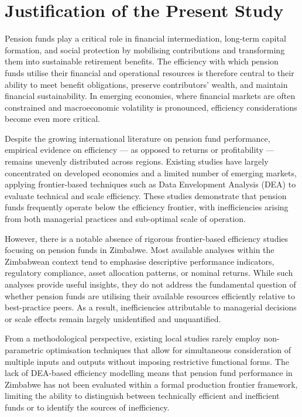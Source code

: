 \documentclass[12pt,a4paper]{article}
\begin{document}
\section{Justification of the Present Study}

Pension funds play a critical role in financial intermediation, long-term capital formation, and social protection by mobilising contributions and transforming them into sustainable retirement benefits. The efficiency with which pension funds utilise their financial and operational resources is therefore central to their ability to meet benefit obligations, preserve contributors' wealth, and maintain financial sustainability. In emerging economies, where financial markets are often constrained and macroeconomic volatility is pronounced, efficiency considerations become even more critical.

Despite the growing international literature on pension fund performance, empirical evidence on efficiency --- as opposed to returns or profitability --- remains unevenly distributed across regions. Existing studies have largely concentrated on developed economies and a limited number of emerging markets, applying frontier-based techniques such as Data Envelopment Analysis (DEA) to evaluate technical and scale efficiency. These studies demonstrate that pension funds frequently operate below the efficiency frontier, with inefficiencies arising from both managerial practices and sub-optimal scale of operation.

However, there is a notable absence of rigorous frontier-based efficiency studies focusing on pension funds in Zimbabwe. Most available analyses within the Zimbabwean context tend to emphasise descriptive performance indicators, regulatory compliance, asset allocation patterns, or nominal returns. While such analyses provide useful insights, they do not address the fundamental question of whether pension funds are utilising their available resources efficiently relative to best-practice peers. As a result, inefficiencies attributable to managerial decisions or scale effects remain largely unidentified and unquantified.

From a methodological perspective, existing local studies rarely employ non-parametric optimisation techniques that allow for simultaneous consideration of multiple inputs and outputs without imposing restrictive functional forms. The lack of DEA-based efficiency modelling means that pension fund performance in Zimbabwe has not been evaluated within a formal production frontier framework, limiting the ability to distinguish between technically efficient and inefficient funds or to identify the sources of inefficiency.
\end{document}
